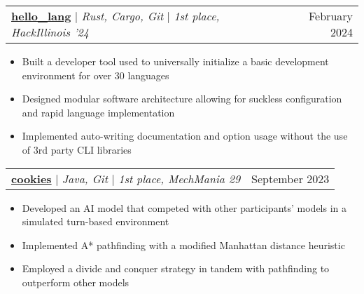 \documentclass[letterpaper,11pt]{article}
\makeatletter
\newcommand{\resumeItem}[1]{
  \item\small{
    {#1 \vspace{-2pt}}
  }
}
\newcommand{\resumeProjectHeading}[2]{
    \item
    \begin{tabular*}{0.97\textwidth}{l@{\extracolsep{\fill}}r}
      \small#1 & #2 \\
    \end{tabular*}\vspace{-7pt}
}
\newcommand{\resumeItemListStart}{\begin{itemize}}
\newcommand{\resumeItemListEnd}{\end{itemize}\vspace{-5pt}}
\makeatother
\begin{document}
        \resumeProjectHeading {
            \textbf{\href{https://devpost.com/software/hello_lang}{hello\_lang}} $|$
            \footnotesize\emph{Rust, Cargo, Git} $|$ 
            \footnotesize\emph{1st place, HackIllinois '24}
        }{ February 2024 }
        \resumeItemListStart
            \resumeItem{Built a developer tool used to universally initialize a basic development environment for over 30 languages}
            \resumeItem{Designed modular software architecture allowing for suckless configuration and rapid language implementation}
            \resumeItem{Implemented auto-writing documentation and option usage without the use of 3rd party CLI libraries}
        \resumeItemListEnd

        \resumeProjectHeading {
            \textbf{\href{https://github.com/RoshanAH/mechmania29}{cookies}} $|$ 
            \footnotesize\emph{Java, Git} $|$
            \footnotesize\emph{1st place, MechMania 29}
        }{ September 2023 }
        \resumeItemListStart
            \resumeItem{Developed an AI model that competed with other participants' models in a simulated turn-based environment}
            \resumeItem{Implemented A* pathfinding with a modified Manhattan distance heuristic}
            \resumeItem{Employed a divide and conquer strategy in tandem with pathfinding to outperform other models}
        \resumeItemListEnd



        
\end{document}
